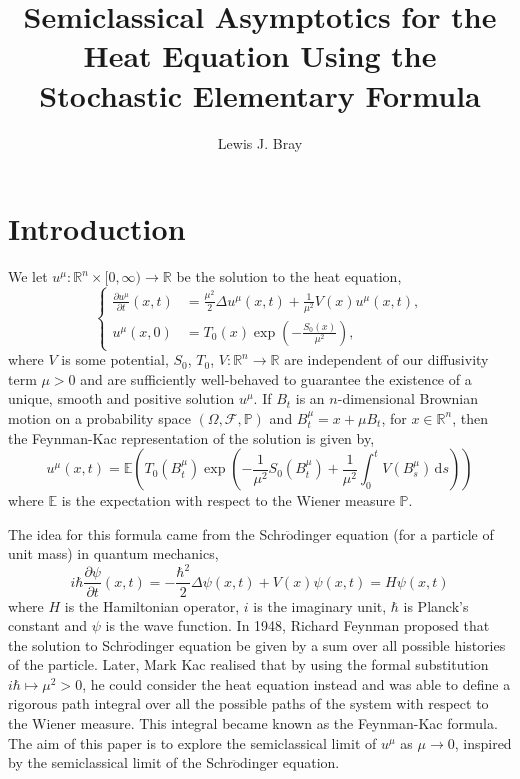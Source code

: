 \documentclass[a4paper,12pt,draft]{report}
\theoremstyle{remark}
\theoremstyle{definition}
\begin{document}
\title{Semiclassical Asymptotics for the Heat Equation Using the Stochastic Elementary Formula}
\author{Lewis J. Bray}

\maketitle

\tableofcontents

\chapter{Introduction}

We let $u^\mu : \mathbb{R}^n \times [0, \infty) \to \mathbb{R}$ be the solution to the heat equation,
$$
\left\{
\begin{aligned}
\frac{\partial u^\mu}{\partial t}(x, t) & = \frac{\mu^2}{2}\Delta u^\mu(x, t) + \frac{1}{\mu^2}V(x)u^\mu(x, t),\\
u^\mu(x, 0) & = T_0(x)\exp\left(-\frac{S_0(x)}{\mu^2}\right),
\end{aligned}
\right.
$$
where $V$ is some potential, $S_0$, $T_0$, $V : \mathbb{R}^n \to \mathbb{R}$ are independent of our diffusivity term $\mu > 0$ and are sufficiently well-behaved to guarantee the existence of a unique, smooth and positive solution $u^\mu$.  If $B_t$ is an $n$-dimensional Brownian motion on a probability space $(\Omega, \mathscr{F}, \mathbb{P})$ and $B_t^\mu = x + \mu B_t$, for $x \in \mathbb{R}^n$, then the Feynman-Kac representation of the solution is given by,
$$
u^\mu(x, t) = \mathbb{E}\left(T_0(B_t^\mu)\exp\left(-\frac{1}{\mu^2}S_0(B_t^\mu) + \frac{1}{\mu^2}\int_0^tV(B_s^\mu)\,\mathrm{d}s\right)\right)
$$
where $\mathbb{E}$ is the expectation with respect to the Wiener measure $\mathbb{P}$.

The idea for this formula came from the Schr$\ddot{\text{o}}$dinger equation (for a particle of unit mass) in quantum mechanics,
$$
i\hbar\frac{\partial\psi}{\partial t}(x, t) = -\frac{\hbar^2}{2}\Delta\psi(x, t) + V(x)\psi(x, t) = H\psi(x, t)
$$
where $H$ is the Hamiltonian operator, $i$ is the imaginary unit, $\hbar$ is Planck's constant and $\psi$ is the wave function.  In 1948, Richard Feynman proposed that the solution to Schr$\ddot{\text{o}}$dinger equation be given by a sum over all possible histories of the particle.  Later, Mark Kac realised that by using the formal substitution $i\hbar \mapsto \mu^2 > 0$, he could consider the heat equation instead and was able to define a rigorous path integral over all the possible paths of the system with respect to the Wiener measure.  This integral became known as the Feynman-Kac formula.  The aim of this paper is to explore the semiclassical limit of $u^\mu$ as $\mu \to 0$, inspired by the semiclassical limit of the Schr$\ddot{\text{o}}$dinger equation.
\end{document}
